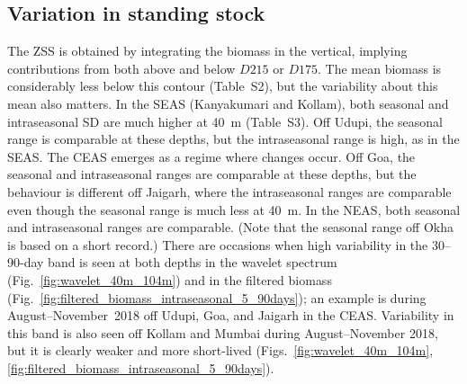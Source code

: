 \documentclass[authoryear,review,11pt]{elsarticle}
\begin{document}
%
%
%
%

\subsection{Variation in standing stock}
\label{sec:intraseasonal.ss}

The ZSS is obtained by integrating the biomass in the vertical, implying contributions from both above and below $D215$ or $D175$.  The mean biomass is considerably less below this contour (Table~S2), but the variability about this mean also matters. In the SEAS (Kanyakumari and Kollam), both seasonal and intraseasonal SD are much higher at 40~m (Table~S3). Off Udupi, the seasonal range is comparable at these depths, but the intraseasonal range is high, as in the SEAS.  The CEAS emerges as a regime where changes occur.  Off Goa, the seasonal and intraseasonal ranges are comparable at these depths, but the behaviour is different off Jaigarh, where the intraseasonal ranges are comparable even though the seasonal range is much less at 40~m. In the NEAS, both seasonal and intraseasonal ranges are comparable.  (Note that the seasonal range off Okha is based on a short record.)  There are occasions when high variability in the 30--90-day band is seen at both depths in the wavelet spectrum (Fig.~\ref{fig:wavelet_40m_104m}) and in the filtered biomass (Fig.~\ref{fig:filtered_biomass_intraseasonal_5_90days}); an example is during August--November~2018 off Udupi, Goa, and Jaigarh in the CEAS. Variability in this band is also seen off Kollam and Mumbai during  August--November 2018, but it is clearly weaker and more short-lived (Figs.~\ref{fig:wavelet_40m_104m},\ref{fig:filtered_biomass_intraseasonal_5_90days}).
\end{document}
